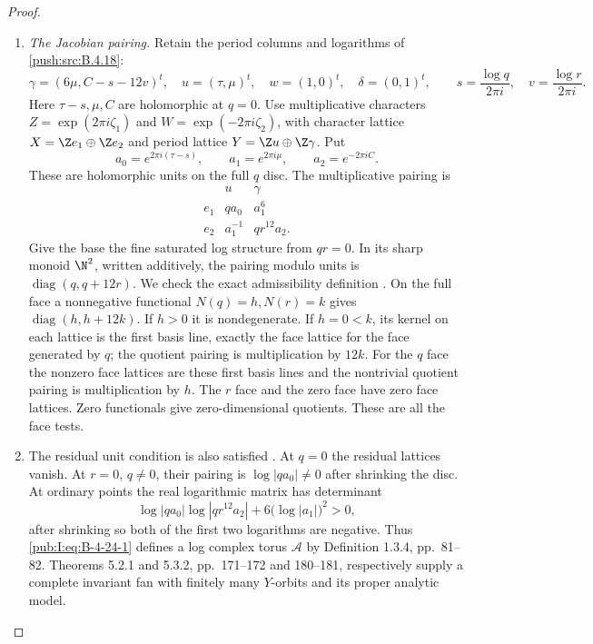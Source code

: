 \begin{proof}
\begin{enumerate}[label=\arabic*.,leftmargin=*]
\item \emph{The Jacobian pairing.}
Retain the period columns and logarithms of \ref{push:src:B.4.18}:
\[
 \gamma=(6\mu,C-s-12v)^t,\quad
 u=(\tau,\mu)^t,\quad w=(1,0)^t,\quad\delta=(0,1)^t,
 \qquad
 s=\frac{\log q}{2\pi i},\quad
 v=\frac{\log r}{2\pi i}.
\]
Here $\tau-s,\mu,C$ are holomorphic at $q=0$.
Use multiplicative characters
$Z=\exp(2\pi i\zeta_1)$ and
$W=\exp(-2\pi i\zeta_2)$, with character lattice
$X=\Z e_1\oplus\Z e_2$ and period lattice
$Y=\Z u\oplus\Z\gamma$. Put
\[
 a_0=e^{2\pi i(\tau-s)},\qquad
 a_1=e^{2\pi i\mu},\qquad a_2=e^{-2\pi iC}.
\]
These are holomorphic units on the full $q$ disc.
The multiplicative pairing is
\begin{equation}
 \begin{array}{c|cc}
       &u&\gamma\\\hline
 e_1&q a_0&a_1^6\\
 e_2&a_1^{-1}&q r^{12}a_2.
 \end{array}
\label{pub:I:eq:B-4-24-1}
\end{equation}
Give the base the fine saturated log structure from
$qr=0$. In its sharp monoid $\N^2$, written additively,
the pairing modulo units is $\operatorname{diag}(q,q+12r)$.
We check the exact admissibility definition
\citep[Definition 1.2.3, pp.~77--78]{KKN2008Root}.
On the full face a nonnegative functional
$N(q)=h,N(r)=k$ gives
$\operatorname{diag}(h,h+12k)$. If $h>0$ it is
nondegenerate. If $h=0<k$, its kernel on each lattice
is the first basis line, exactly the face lattice
for the face generated by $q$; the quotient pairing
is multiplication by $12k$. For the $q$ face the
nonzero face lattices are these first basis lines
and the nontrivial quotient pairing is multiplication
by $h$. The $r$ face and the zero face have zero
face lattices. Zero functionals give zero-dimensional
quotients. These are all the face tests.

\item The residual unit condition is also satisfied
\citep[Definition 1.2.6, p.~79]{KKN2008Root}.
At $q=0$ the residual lattices vanish. At $r=0$,
$q\ne0$, their pairing is $\log|q a_0|\ne0$ after
shrinking the disc. At ordinary points the real
logarithmic matrix has determinant
\[
 \log|q a_0|\log|q r^{12}a_2|
                 +6\bigl(\log|a_1|\bigr)^2>0,
\]
after shrinking so both of the first two logarithms
are negative. Thus \eqref{pub:I:eq:B-4-24-1} defines a log complex
torus $\mathcal A$ by Definition 1.3.4, pp.~81--82.
Theorems 5.2.1 and 5.3.2, pp.~171--172 and 180--181,
respectively supply a complete invariant fan with
finitely many $Y$-orbits and its proper analytic
model.


\end{enumerate}
\end{proof}
